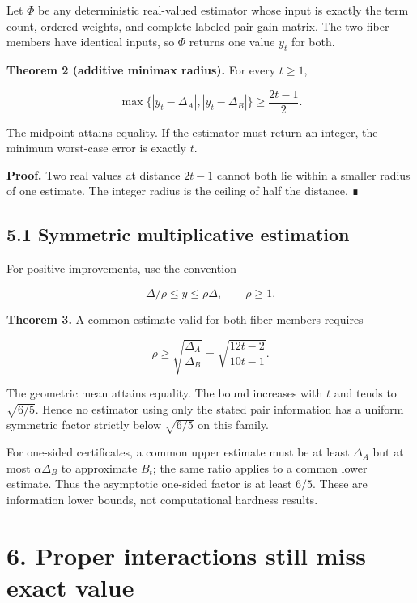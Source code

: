 \documentclass[
  11pt,
]{article}
\begin{document}
Let \(\Phi\) be any deterministic real-valued estimator whose input is
exactly the term count, ordered weights, and complete labeled pair-gain
matrix. The two fiber members have identical inputs, so \(\Phi\) returns
one value \(y_t\) for both.

\textbf{Theorem 2 (additive minimax radius).} For every \(t\ge1\),

\[
\max\{|y_t-\Delta_A|,|y_t-\Delta_B|\}
\ge \frac{2t-1}{2}.
\]

The midpoint attains equality. If the estimator must return an integer,
the minimum worst-case error is exactly \(t\).

\textbf{Proof.} Two real values at distance \(2t-1\) cannot both lie
within a smaller radius of one estimate. The integer radius is the
ceiling of half the distance. ∎

\hypertarget{symmetric-multiplicative-estimation}{%
\subsection{5.1 Symmetric multiplicative
estimation}\label{symmetric-multiplicative-estimation}}

For positive improvements, use the convention

\[
\Delta/\rho\le y\le\rho\Delta,
\qquad \rho\ge1.
\]

\textbf{Theorem 3.} A common estimate valid for both fiber members
requires

\[
\rho\ge
\sqrt{\frac{\Delta_A}{\Delta_B}}
=\sqrt{\frac{12t-2}{10t-1}}.
\]

The geometric mean attains equality. The bound increases with \(t\) and
tends to \(\sqrt{6/5}\). Hence no estimator using only the stated pair
information has a uniform symmetric factor strictly below \(\sqrt{6/5}\)
on this family.

For one-sided certificates, a common upper estimate must be at least
\(\Delta_A\) but at most \(\alpha\Delta_B\) to approximate \(B_t\); the
same ratio applies to a common lower estimate. Thus the asymptotic
one-sided factor is at least \(6/5\). These are information lower
bounds, not computational hardness results.

\hypertarget{proper-interactions-still-miss-exact-value}{%
\section{6. Proper interactions still miss exact
value}\label{proper-interactions-still-miss-exact-value}}
\end{document}

